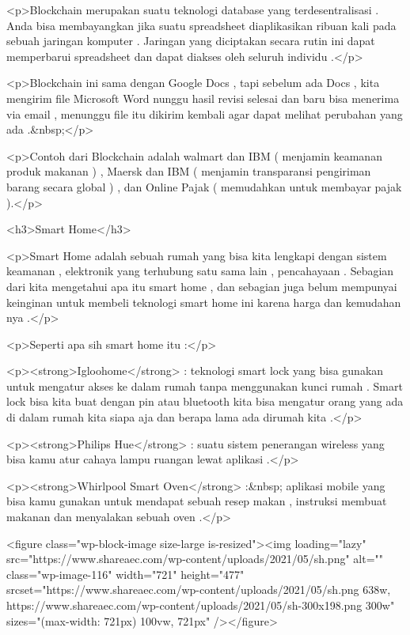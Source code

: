 <p>Blockchain merupakan suatu teknologi database yang terdesentralisasi . Anda bisa membayangkan jika suatu spreadsheet diaplikasikan ribuan kali pada sebuah jaringan komputer . Jaringan yang diciptakan secara rutin ini dapat memperbarui spreadsheet dan dapat diakses oleh seluruh individu .</p>



<p>Blockchain ini sama dengan Google Docs , tapi sebelum ada Docs , kita mengirim file Microsoft Word nunggu hasil revisi selesai dan baru bisa menerima via email , menunggu file itu dikirim kembali agar dapat melihat perubahan yang ada .&nbsp;</p>



<p>Contoh dari Blockchain adalah walmart dan IBM ( menjamin keamanan produk makanan ) , Maersk dan IBM ( menjamin transparansi pengiriman barang secara global ) , dan Online Pajak ( memudahkan untuk membayar pajak ).</p>



<h3>Smart Home</h3>



<p>Smart Home adalah sebuah rumah yang bisa kita lengkapi dengan sistem keamanan , elektronik yang terhubung satu sama lain , pencahayaan . Sebagian dari kita mengetahui apa itu smart home , dan sebagian juga belum mempunyai keinginan untuk membeli teknologi smart home ini karena harga dan kemudahan nya .</p>



<p>Seperti apa sih smart home itu :</p>



<p><strong>Igloohome</strong> : teknologi smart lock yang bisa gunakan untuk mengatur akses ke dalam rumah tanpa menggunakan kunci rumah . Smart lock bisa kita buat dengan pin atau bluetooth kita bisa mengatur orang yang ada di dalam rumah kita siapa aja dan berapa lama ada dirumah kita .</p>



<p><strong>Philips Hue</strong> : suatu sistem penerangan wireless yang bisa kamu atur cahaya lampu ruangan lewat aplikasi .</p>



<p><strong>Whirlpool Smart Oven</strong> :&nbsp; aplikasi mobile yang bisa kamu gunakan untuk mendapat sebuah resep makan , instruksi membuat makanan dan menyalakan sebuah oven .</p>



<figure class="wp-block-image size-large is-resized"><img loading="lazy" src="https://www.shareaec.com/wp-content/uploads/2021/05/sh.png" alt="" class="wp-image-116" width="721" height="477" srcset="https://www.shareaec.com/wp-content/uploads/2021/05/sh.png 638w, https://www.shareaec.com/wp-content/uploads/2021/05/sh-300x198.png 300w" sizes="(max-width: 721px) 100vw, 721px" /></figure>



